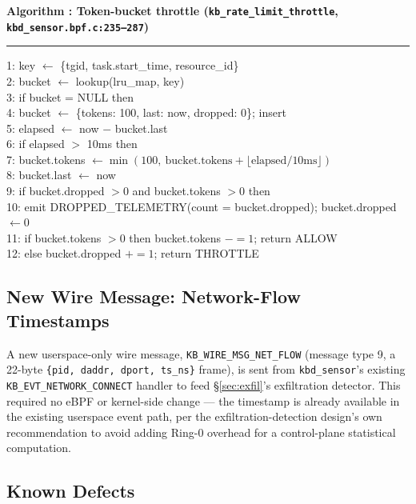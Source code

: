 \documentclass{article}
\newcounter{algo}
\newenvironment{algobox}[1]{%
  \begin{framed}\refstepcounter{algo}\textbf{\sffamily\small Algorithm \thealgo: #1}\vspace{3pt}\hrule\vspace{5pt}
  \small\ttfamily\raggedright
}{%
  \end{framed}
}
\begin{document}
\begin{algobox}{Token-bucket throttle (\texttt{kb\_rate\_limit\_throttle}, \texttt{kbd\_sensor.bpf.c:235--287})}
\label{alg:ratelimit}
1: key $\gets$ \{tgid, task.start\_time, resource\_id\}\\
2: bucket $\gets$ lookup(lru\_map, key)\\
3: if bucket = NULL then\\
4: \quad bucket $\gets$ \{tokens: 100, last: now, dropped: 0\}; insert\\
5: elapsed $\gets$ now $-$ bucket.last\\
6: if elapsed $>$ 10ms then\\
7: \quad bucket.tokens $\gets \min(100,\ \text{bucket.tokens} + \lfloor\text{elapsed}/\text{10ms}\rfloor)$\\
8: \quad bucket.last $\gets$ now\\
9: if bucket.dropped $>0$ and bucket.tokens $>0$ then\\
10: \quad emit DROPPED\_TELEMETRY(count = bucket.dropped); bucket.dropped $\gets 0$\\
11: if bucket.tokens $>0$ then bucket.tokens $\mathrel{-}= 1$; return ALLOW\\
12: else bucket.dropped $\mathrel{+}= 1$; return THROTTLE
\end{algobox}

\subsection{New Wire Message: Network-Flow Timestamps}

A new userspace-only wire message, \texttt{KB\_WIRE\_MSG\_NET\_FLOW}
(message type 9, a 22-byte \texttt{\{pid, daddr, dport, ts\_ns\}}
frame), is sent from \texttt{kbd\_sensor}'s existing
\texttt{KB\_EVT\_NETWORK\_CONNECT} handler to feed
\S\ref{sec:exfil}'s exfiltration detector. This required no eBPF or
kernel-side change --- the timestamp is already available in the
existing userspace event path, per the exfiltration-detection design's
own recommendation to avoid adding Ring-0 overhead for a control-plane
statistical computation.

\subsection{Known Defects}
\end{document}
